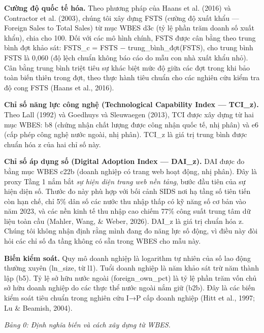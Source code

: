 \documentclass[12pt,a4paper]{article}
\begin{document}
\textbf{Cường độ quốc tế hóa.} Theo phương pháp của Haans et al. (2016)
và Contractor et al. (2003), chúng tôi xây dựng FSTS (cường độ xuất khẩu
--- Foreign Sales to Total Sales) từ mục WBES d3c (tỷ lệ phần trăm doanh
số xuất khẩu), chia cho 100. Đối với các mô hình chính, FSTS được cân
bằng theo trung bình đợt khảo sát: FSTS\_c = FSTS −
trung\_bình\_đợt(FSTS), cho trung bình FSTS là 0,060 (độ lệch chuẩn
không báo cáo do mẫu con nhà xuất khẩu nhỏ). Cân bằng trung bình triệt
tiêu sự khác biệt mức độ giữa các đợt trong khi bảo toàn biến thiên
trong đợt, theo thực hành tiêu chuẩn cho các nghiên cứu kiểm tra độ cong
FSTS (Haans et al., 2016).

\textbf{Chỉ số năng lực công nghệ (Technological Capability Index ---
TCI\_z).} Theo Lall (1992) và Goedhuys và Sleuwaegen (2013), TCI được
xây dựng từ hai mục WBES: b8 (chứng nhận chất lượng được công nhận quốc
tế, nhị phân) và e6 (cấp phép công nghệ nước ngoài, nhị phân). TCI\_z là
giá trị trung bình được chuẩn hóa z của hai chỉ số này.

\textbf{Chỉ số áp dụng số (Digital Adoption Index --- DAI\_z).} DAI được
đo bằng mục WBES c22b (doanh nghiệp có trang web hoạt động, nhị phân).
Đây là proxy Tầng 1 nắm bắt \emph{sự hiện diện trang web nền tảng}, bước
đầu tiên của sự hiện diện số. Thước đo này phù hợp với bối cảnh SIDS nơi
hạ tầng số tiên tiến còn hạn chế, chỉ 5\% dân số các nước thu nhập thấp
có kỹ năng số cơ bản vào năm 2023, và các nền kinh tế thu nhập cao chiếm
77\% công suất trung tâm dữ liệu toàn cầu (Mahler, Wang, \& Weber,
2026). DAI\_z là giá trị chuẩn hóa z. Chúng tôi không nhận định rằng
mình đang đo năng lực số động, vì điều này đòi hỏi các chỉ số đa tầng
không có sẵn trong WBES cho mẫu này.

\textbf{Biến kiểm soát.} Quy mô doanh nghiệp là logarithm tự nhiên của
số lao động thường xuyên (ln\_size, từ l1). Tuổi doanh nghiệp là năm
khảo sát trừ năm thành lập (b5). Tỷ lệ sở hữu nước ngoài
(foreign\_own\_pct) là tỷ lệ phần trăm vốn chủ sở hữu doanh nghiệp do
các thực thể nước ngoài nắm giữ (b2b). Đây là các biến kiểm soát tiêu
chuẩn trong nghiên cứu I→P cấp doanh nghiệp (Hitt et al., 1997; Lu \&
Beamish, 2004).

\emph{Bảng 0: Định nghĩa biến và cách xây dựng từ WBES.}
\end{document}
